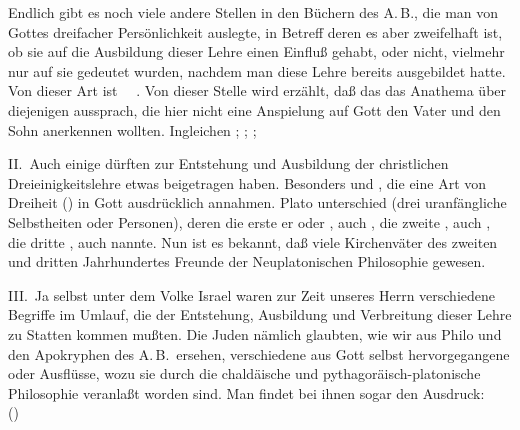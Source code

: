\begin{aufza}
\item Endlich gibt es noch viele andere Stellen in den Büchern des A.\,B., die man von Gottes dreifacher Persönlichkeit auslegte, in Betreff deren es aber zweifelhaft ist, ob sie auf die Ausbildung dieser Lehre einen Einfluß gehabt, oder nicht, vielmehr nur auf sie gedeutet wurden, nachdem man diese Lehre bereits ausgebildet hatte. Von dieser Art ist \zB\ \ . Von dieser Stelle wird erzählt, daß das  das Anathema über diejenigen aussprach, die hier nicht eine Anspielung auf Gott den Vater und den Sohn anerkennen wollten. Ingleichen ; ; ;  \uam\ 
\end{aufza}\par

\vabst II.~Auch einige  dürften zur Entstehung und Ausbildung der christlichen Dreieinigkeitslehre etwas beigetragen haben. Besonders  und , die eine Art von Dreiheit () in Gott ausdrücklich annahmen. Plato unterschied  (drei uranfängliche Selbstheiten oder Personen), deren die erste er  oder , auch , die zweite , auch , die dritte , auch  nannte. Nun ist es bekannt, daß viele Kirchenväter des zweiten und dritten Jahrhundertes Freunde der Neuplatonischen Philosophie gewesen.\par

\vabst III.~Ja selbst unter dem Volke Israel waren zur Zeit unseres Herrn verschiedene Begriffe im Umlauf, die der Entstehung, Ausbildung und Verbreitung dieser Lehre zu Statten kommen mußten. Die  Juden nämlich glaubten, wie wir aus Philo und den Apokryphen des A.\,B.\ ersehen, verschiedene aus Gott selbst hervorgegangene  oder Ausflüsse, wozu sie durch die chaldäische und pythagoräisch-platonische Philosophie veranlaßt worden sind. Man findet bei ihnen sogar den Ausdruck: ~\  ()

